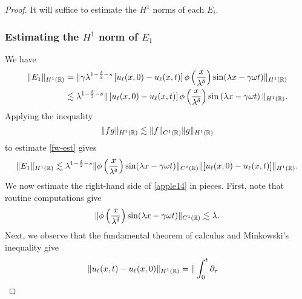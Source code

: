 \begin{proof}
    It will suffice to estimate the $H^1$ norms of each $E_i$. \vspace{0.25cm}\\
\subsubsection{Estimating the $H^1$ norm of $\hyperref[all_errors_together]{E_1}$} 
We have
%
%
\begin{equation}
\label{fw-est}
\begin{split}
\|E_1\|_{H^1(\mathbb{R})}
& = \| \gamma \lambda^{1 -\frac{\delta}{2}-s} \left[ u_\ell(x,0) - u_\ell(x,t) \right]
\phi\left( \frac{x}{\lambda^\delta}
\right ) \sin (\lambda x - \gamma \omega t )\|_{H^1(\mathbb{R})}
\\
& \lesssim \lambda^{1 -\frac{\delta}{2} -s } \|\left[ u_\ell(x,0) - 
u_\ell(x,t)
\right] \phi\left( \frac{x}{\lambda^\delta} \right )
\sin\left( \lambda x - \gamma \omega t
\right) \|_{H^1(\mathbb{R})}.
\end{split}
\end{equation}
%
%
Applying the inequality 
%
%
\begin{equation}
\label{applec}
\|fg\|_{H^1(\mathbb{R})} \lesssim \|f\|_{C^1(\mathbb{R})} \|g\|_{H^1(\mathbb{R})}
\end{equation}
%
%
%
%
%
%
%
%
to estimate \eqref{fw-est} gives
%
%
\begin{equation}
\begin{split}
\|E_1\|_{H^1(\mathbb{R})} \lesssim \lambda^{1 - \frac{\delta}{2} -s } \|\phi
\left( \frac{x}{\lambda^\delta} \right) \sin (\lambda x - \gamma \omega t)
\|_{C^1(\mathbb{R})} \|[u_\ell (x,0) - u_\ell (x,t) ] \|_{H^1(\mathbb{R})}.
\label{apple14}
\end{split}
\end{equation}
%
%
We now estimate the right-hand side of \eqref{apple14} in pieces. First, 
note that routine computations give
%
%
\begin{equation}
\begin{split}
\|\phi\left( \frac{x}{\lambda^\delta} \right) \sin(\lambda x - \gamma 
\omega t)
\|_{C^1(\mathbb{R})}
\lesssim \lambda.
\label{apple15}
\end{split}
\end{equation}
%
%
Next, we observe that the fundamental 
theorem
of calculus and Minkowski's inequality give
%
%
%
%
\begin{equation}
\begin{split}
\|u_\ell(x,t) - u_\ell(x,0)\|_{H^1(\rr)}
& =  \| \int_0^t \p_\tau

\end{split}
\end{equation}
\end{proof}
